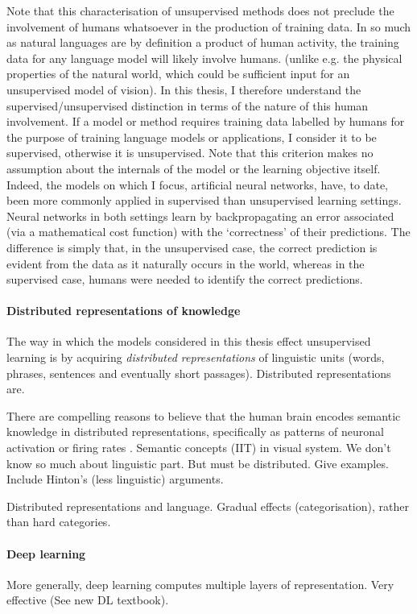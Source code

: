 Note that this characterisation of unsupervised methods does not preclude the involvement of humans whatsoever in the production of training data. In so much as natural languages are by definition a product of human activity, the training data for any language model will likely involve humans. (unlike e.g. the physical properties of the natural world, which could be sufficient input for an unsupervised model of vision). In this thesis, I therefore understand the supervised/unsupervised distinction in terms of the nature of this human involvement. If a model or method requires training data labelled by humans for the purpose of training language models or applications, I consider it to be supervised, otherwise it is unsupervised. Note that this criterion makes no assumption about the internals of the model or the learning objective itself. Indeed, the models on which I focus, artificial neural networks, have, to date, been more commonly applied in supervised than unsupervised learning settings. Neural networks in both settings learn by backpropagating an error associated (via a mathematical cost function) with the `correctness' of their predictions. The difference is simply that, in the unsupervised case, the correct prediction is evident from the data as it naturally occurs in the world, whereas in the supervised case, humans were needed to identify the correct predictions.  

\paragraph{Distributed representations of knowledge} The way in which the models considered in this thesis effect unsupervised learning is by acquiring \emph{distributed representations} of linguistic units (words, phrases, sentences and eventually short passages). Distributed representations are. 

There are compelling reasons to believe that the human brain encodes semantic knowledge in distributed representations, specifically as patterns of neuronal activation or firing rates . Semantic concepts (IIT) in visual system. We don't know so much about linguistic part. But must be distributed. Give examples. Include Hinton's (less linguistic) arguments.   

Distributed representations and language. Gradual effects (categorisation), rather than hard categories. 

\paragraph{Deep learning} More generally, deep learning computes multiple layers of representation. Very effective (See new DL textbook).

